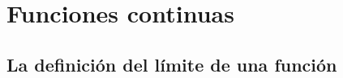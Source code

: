 \chapter{Funciones continuas}

\setcounter{section}{1}
\section{La definición del límite de una función}

